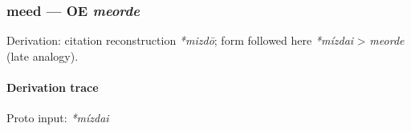 \documentclass[
  british,
  a4paper,
]{article}
\begin{document}
\subsubsection{\texorpdfstring{meed --- OE
\emph{meorde}}{meed --- OE meorde}}\label{meed-oe-meorde}

Derivation: citation reconstruction \emph{*mizdō}; form followed here
\emph{*mízdai} \textgreater{} \emph{meorde} (late analogy).

\paragraph{Derivation trace}\label{derivation-trace-164}

Proto input: \emph{*mízdai}

\begingroup
\setlength{\fboxsep}{6pt}
\end{document}
